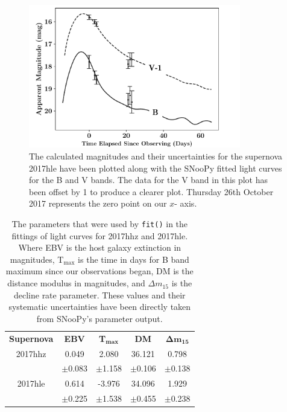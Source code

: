 \documentclass[twocolumn]{revtex4}
\begin{document}
\begin{figure}[!h]
\begin{center}
\includegraphics[width=9.25cm]{results/2017hle}
\caption[]{The calculated magnitudes and their uncertainties for the supernova 2017hle have been plotted along with the SNooPy fitted light curves for the B and V bands. The data for the V band in this plot has been offset by 1 to produce a clearer plot. Thursday 26th October 2017 represents the zero point on our $x$- axis.}
\label{fig:2017hle_lc}
\vspace{-1.5em}
\end{center}
\end{figure}

\begin{table}[h!]
\centering
\begin{tabular}{c@{\hskip 15pt}c@{\hskip 15pt}c@{\hskip 15pt}c@{\hskip 15pt}c} 
 \hline
 \textbf{Supernova} & \textbf{EBV} & \textbf{T$_{\boldsymbol{\max}}$} & \textbf{DM} & \textbf{$\boldsymbol{\Delta m_{15}}$} \\ [0.5ex] 
 2017hhz & 0.049 & 2.080 &  36.121 & 0.798 \\
  & $\pm$0.083 & $\pm$1.158 & $\pm$0.106 & $\pm$0.138 \\
  
 2017hle & 0.614 & -3.976 &  34.096 & 1.929 \\
  & $\pm$0.225 & $\pm$1.538 & $\pm$0.455 & $\pm$0.238 \\
 \hline
\end{tabular}
\caption{The parameters that were used by \texttt{fit()} in the fittings of light curves for 2017hhz and 2017hle. Where EBV is the host galaxy extinction in magnitudes, T$_{\max}$ is the time in days for B band maximum since our observations began, DM is the distance modulus in magnitudes, and $\Delta m_{15}$ is the decline rate parameter. These values and their systematic uncertainties have been directly taken from SNooPy's parameter output.}
\vspace{-1.5em}
\label{table:snpy_summary}
\end{table}
\end{document}
